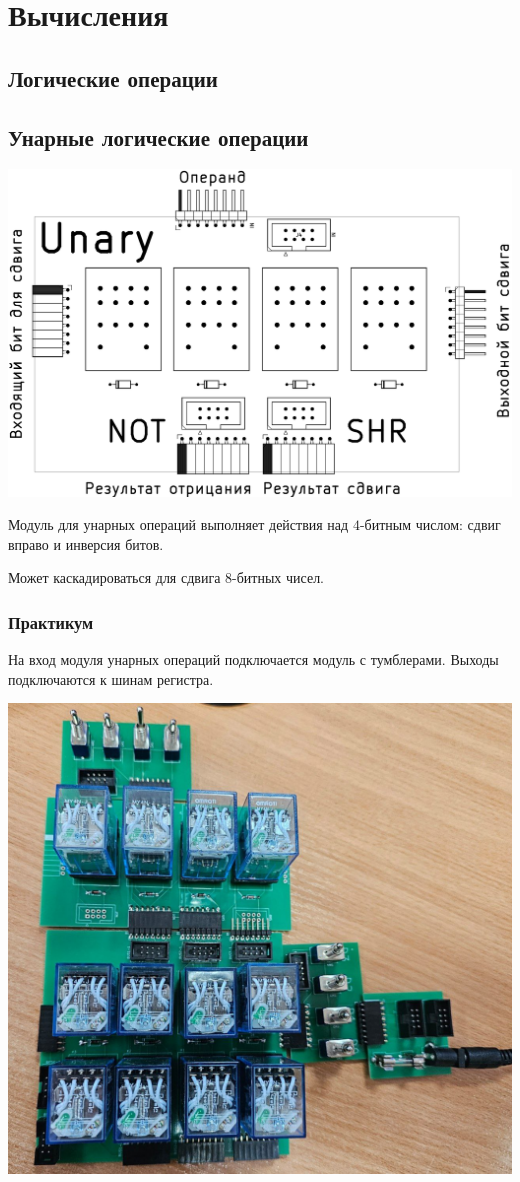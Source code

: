 
\chapter{Вычисления}

\section{Логические операции}

\section{Унарные логические операции}

\begin{center}
\includegraphics{boards/logic_unary.png}
\end{center}

Модуль для унарных операций выполняет действия над $4$-битным числом: сдвиг вправо и инверсия битов.

Может каскадироваться для сдвига $8$-битных чисел.

\subsection{Практикум}

На вход модуля унарных операций подключается модуль с тумблерами.
Выходы подключаются к шинам регистра.


\includegraphics[width=0.5\columnwidth]{photo/unary.jpg}

